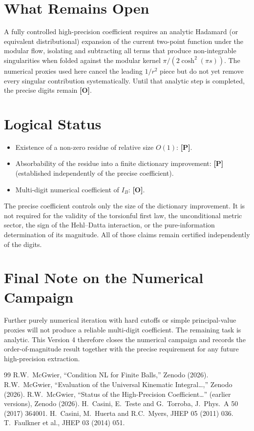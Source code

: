 \documentclass[11pt]{article}
\newcommand{\pP}{\textbf{[P]}}
\newcommand{\pO}{\textbf{[O]}}
\begin{document}
\section{What Remains Open}
A fully controlled high-precision coefficient requires an analytic
Hadamard (or equivalent distributional) expansion of the current
two-point function under the modular flow, isolating and subtracting
all terms that produce non-integrable singularities when folded against
the modular kernel $\pi/(2\cosh^{2}(\pi s))$. The numerical proxies used
here cancel the leading $1/r^{2}$ piece but do not yet remove every
singular contribution systematically. Until that analytic step is
completed, the precise digits remain \pO{}.

\section{Logical Status}
\begin{itemize}[leftmargin=1.4em]
\item Existence of a non-zero residue of relative size $O(1)$: \pP{}.
\item Absorbability of the residue into a finite dictionary improvement:
\pP{} (established independently of the precise coefficient).
\item Multi-digit numerical coefficient of $I_B$: \pO{}.
\end{itemize}
The precise coefficient controls only the size of the dictionary
improvement. It is not required for the validity of the torsionful first
law, the unconditional metric sector, the sign of the Hehl--Datta
interaction, or the pure-information determination of its magnitude.
All of those claims remain certified independently of the digits.

\section*{Final Note on the Numerical Campaign}
Further purely numerical iteration with hard cutoffs or simple
principal-value proxies will not produce a reliable multi-digit
coefficient. The remaining task is analytic. This Version 4 therefore
closes the numerical campaign and records the order-of-magnitude result
together with the precise requirement for any future high-precision
extraction.

\begin{thebibliography}{99}
 R.W.\ McGwier, ``Condition NL for Finite Balls,'' Zenodo (2026).
 R.W.\ McGwier, ``Evaluation of the Universal Kinematic Integral\ldots,'' Zenodo (2026).
 R.W.\ McGwier, ``Status of the High-Precision Coefficient\ldots'' (earlier versions), Zenodo (2026).
 H.\ Casini, E.\ Teste and G.\ Torroba, J.\ Phys.\ A 50 (2017) 364001.
 H.\ Casini, M.\ Huerta and R.C.\ Myers, JHEP 05 (2011) 036.
 T.\ Faulkner et al., JHEP 03 (2014) 051.
\end{thebibliography}
\end{document}
